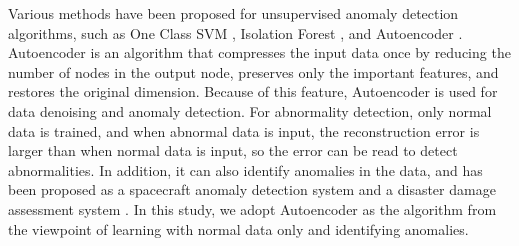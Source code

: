 \documentclass[paper]{ieice}
\begin{document}
%
Various methods have been proposed for unsupervised anomaly detection algorithms, such as One Class SVM \cite{chen2001one}, Isolation Forest \cite{isolationforest}, and Autoencoder \cite{bank2021autoencoders}.
%
Autoencoder is an algorithm that compresses the input data once by reducing the number of nodes in the output node, preserves only the important features, and restores the original dimension.
%
Because of this feature, Autoencoder is used for data denoising and anomaly detection.
%
For abnormality detection, only normal data is trained, and when abnormal data is input, the reconstruction error is larger than when normal data is input, so the error can be read to detect abnormalities.
%
In addition, it can also identify anomalies in the data, and has been proposed as a spacecraft anomaly detection system \cite{sakurada} and a disaster damage assessment system \cite{kinami}.
%
In this study, we adopt Autoencoder as the algorithm from the viewpoint of learning with normal data only and identifying anomalies.
%


\begin{thebibliography}{99}%
\bibitem{}
\end{thebibliography}

\end{document}
